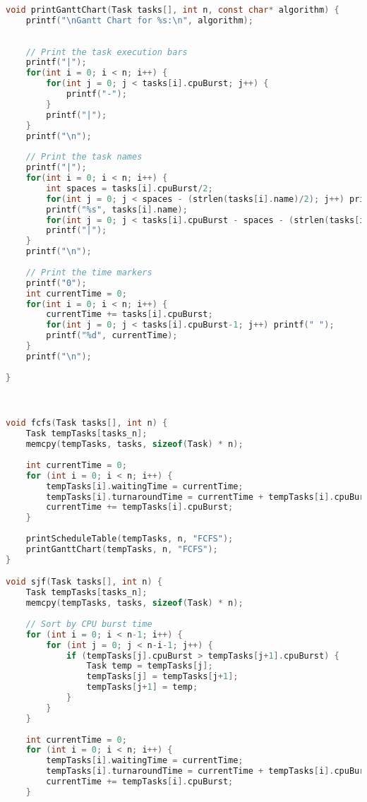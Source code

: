 \documentclass{article}
\begin{document}
\begin{lstlisting}[language=C, caption=Scheduling Code ]
void printGanttChart(Task tasks[], int n, const char* algorithm) {
    printf("\nGantt Chart for %s:\n", algorithm);
  
    
    // Print the task execution bars
    printf("|");
    for(int i = 0; i < n; i++) {
        for(int j = 0; j < tasks[i].cpuBurst; j++) {
            printf("-");
        }
        printf("|");
    }
    printf("\n");
    
    // Print the task names
    printf("|");
    for(int i = 0; i < n; i++) {
        int spaces = tasks[i].cpuBurst/2;
        for(int j = 0; j < spaces - (strlen(tasks[i].name)/2); j++) printf(" ");
        printf("%s", tasks[i].name);
        for(int j = 0; j < tasks[i].cpuBurst - spaces - (strlen(tasks[i].name) - strlen(tasks[i].name)/2); j++) printf(" ");
        printf("|");
    }
    printf("\n");
    
    // Print the time markers
    printf("0");
    int currentTime = 0;
    for(int i = 0; i < n; i++) {
        currentTime += tasks[i].cpuBurst;
        for(int j = 0; j < tasks[i].cpuBurst-1; j++) printf(" ");
        printf("%d", currentTime);
    }
    printf("\n");
   
}



void fcfs(Task tasks[], int n) {
    Task tempTasks[tasks_n];
    memcpy(tempTasks, tasks, sizeof(Task) * n);
    
    int currentTime = 0;
    for (int i = 0; i < n; i++) {
        tempTasks[i].waitingTime = currentTime;
        tempTasks[i].turnaroundTime = currentTime + tempTasks[i].cpuBurst;
        currentTime += tempTasks[i].cpuBurst;
    }
    
    printScheduleTable(tempTasks, n, "FCFS");
    printGanttChart(tempTasks, n, "FCFS");
}

void sjf(Task tasks[], int n) {
    Task tempTasks[tasks_n];
    memcpy(tempTasks, tasks, sizeof(Task) * n);
    
    // Sort by CPU burst time
    for (int i = 0; i < n-1; i++) {
        for (int j = 0; j < n-i-1; j++) {
            if (tempTasks[j].cpuBurst > tempTasks[j+1].cpuBurst) {
                Task temp = tempTasks[j];
                tempTasks[j] = tempTasks[j+1];
                tempTasks[j+1] = temp;
            }
        }
    }
    
    int currentTime = 0;
    for (int i = 0; i < n; i++) {
        tempTasks[i].waitingTime = currentTime;
        tempTasks[i].turnaroundTime = currentTime + tempTasks[i].cpuBurst;
        currentTime += tempTasks[i].cpuBurst;
    }
    

\end{lstlisting}
\end{document}
